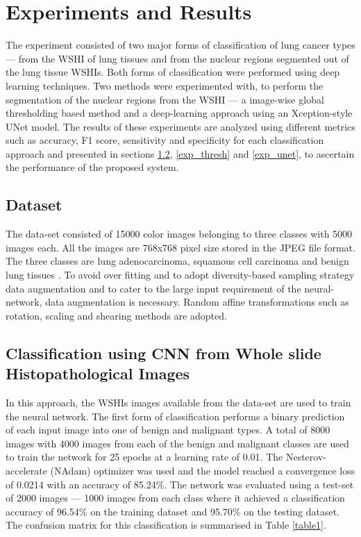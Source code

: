 \documentclass[conference]{IEEEtran}
\begin{document}
 \section{Experiments and Results}
The experiment consisted of two major forms of classification of lung cancer types --- from the WSHI of lung tissues and from the nuclear regions segmented out of the lung tissue WSHIs. Both forms of classification were performed using deep learning techniques. Two methods were experimented with, to perform the segmentation of the nuclear regions from the WSHI --- a image-wise global thresholding based method and a deep-learning approach using an Xception-style UNet model. The results of these experiments are analyzed using different metrics such as accuracy, F1 score, sensitivity and specificity for each classification approach and presented in sections \ref{exp_WSHI}, \ref{exp_thresh} and \ref{exp_unet}, to ascertain the performance of the proposed system.

\subsection{Dataset}
The data-set consisted of 15000 color images belonging to three classes with 5000 images each. All the images are 768x768 pixel size stored in the JPEG file format. The three classes are lung adenocarcinoma, squamous cell carcinoma and benign lung tissues \cite{conf-dataset}.  To avoid over fitting and to adopt diversity-based sampling strategy data augmentation and to cater to the large input requirement of the neural-network, data augmentation is necessary. Random affine transformations such as rotation, scaling and shearing methods are adopted.


\subsection{Classification using CNN from Whole slide Histopathological Images}
\label{exp_WSHI}

In this approach, the WSHIs images available from the data-set are used to train the neural network. The first form of classification performs a binary prediction of each input image into one of benign and malignant types. A total of 8000 images with 4000 images from each of the benign and malignant classes are used to train the network for 25 epochs at a learning rate of 0.01. The Nesterov-accelerate (NAdam) optimizer was used and the model reached a convergence loss of 0.0214 with an accuracy of 85.24\%. The network was evaluated using a test-set of 2000 images --- 1000 images from each class where it achieved a classification accuracy of 96.54\% on the training dataset and 95.70\% on the testing dataset. The confusion matrix for this classification is summarised in Table \ref{table1}.
\end{document}
